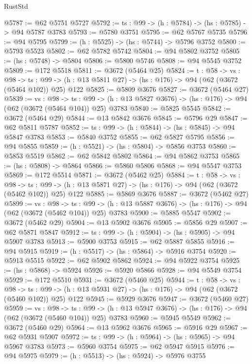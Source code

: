 \begin{lexlean}{RustStd}
\begin{coremodule}
@5787 := @62 @5751 @5727
@5792 := {ts : @99} -> (h : @5784) -> (hs : @5785) -> @94 @5787 @3783
@5793 := @5780 @3751
@5795 := @62 @5767 @5735
@5796 := @94 @5795
@5799 := (h : @5525) -> (hs : @5744) -> @5796 @3752
@5800 := @5793 @5523
@5802 := @62 @5782 @5742
@5804 := @94 @5802 @3752
@5805 := (hs : @5748) -> @5804
@5806 := @5800 @5746
@5808 := @94 @5545 @3752
@5809 := @172 @5518
@5811 := @3672 (@5464 @25)
@5824 := {t : @58} ->
  {vs : @98} ->
  {ts : @99} -> (h : @13 @5811 @27) -> (hs : @176) -> @94 (@62 (@3672 (@5464 @102)) @25) @122
@5825 := @5809 @3676
@5827 := @3672 (@5464 @27)
@5839 := {vs : @98} ->
  {ts : @99} -> (h : @13 @5827 @3676) -> (hs : @176) -> @94 (@62 (@3672 (@5464 @104)) @25) @3783
@5840 := @5825 @5545
@5842 := @3672 (@5464 @29)
@5844 := @13 @5842 @3676
@5845 := @5796 @29
@5847 := @62 @5811 @5787
@5852 := {ts : @99} -> (h : @5844) -> (hs : @5845) -> @94 @5847 @3783
@5853 := @5840 @3752
@5855 := @62 @5827 @5795
@5856 := @94 @5855
@5859 := (h : @5521) -> (hs : @5804) -> @5856 @3753
@5860 := @5853 @5519
@5862 := @62 @5842 @5802
@5864 := @94 @5862 @3753
@5865 := (hs : @5808) -> @5864
@5866 := @5860 @5806
@5868 := @94 @5547 @3753
@5869 := @172 @5514
@5871 := @3672 (@5462 @25)
@5884 := {t : @58} ->
  {vs : @98} ->
  {ts : @99} -> (h : @13 @5871 @27) -> (hs : @176) -> @94 (@62 (@3672 (@5462 @102)) @25) @122
@5885 := @5869 @3676
@5887 := @3672 (@5462 @27)
@5899 := {vs : @98} ->
  {ts : @99} -> (h : @13 @5887 @3676) -> (hs : @176) -> @94 (@62 (@3672 (@5462 @104)) @25) @3783
@5900 := @5885 @5547
@5902 := @3672 (@5462 @29)
@5904 := @13 @5902 @3676
@5905 := @5856 @29
@5907 := @62 @5871 @5847
@5912 := {ts : @99} -> (h : @5904) -> (hs : @5905) -> @94 @5907 @3783
@5913 := @5900 @3753
@5915 := @62 @5887 @5855
@5916 := @94 @5915
@5919 := (h : @5517) -> (hs : @5864) -> @5916 @3754
@5920 := @5913 @5515
@5922 := @62 @5902 @5862
@5924 := @94 @5922 @3754
@5925 := (hs : @5868) -> @5924
@5926 := @5920 @5866
@5928 := @94 @5549 @3754
@5929 := @172 @5510
@5931 := @3672 (@5460 @25)
@5944 := {t : @58} ->
  {vs : @98} ->
  {ts : @99} -> (h : @13 @5931 @27) -> (hs : @176) -> @94 (@62 (@3672 (@5460 @102)) @25) @122
@5945 := @5929 @3676
@5947 := @3672 (@5460 @27)
@5959 := {vs : @98} ->
  {ts : @99} -> (h : @13 @5947 @3676) -> (hs : @176) -> @94 (@62 (@3672 (@5460 @104)) @25) @3783
@5960 := @5945 @5549
@5962 := @3672 (@5460 @29)
@5964 := @13 @5962 @3676
@5965 := @5916 @29
@5967 := @62 @5931 @5907
@5972 := {ts : @99} -> (h : @5964) -> (hs : @5965) -> @94 @5967 @3783
@5973 := @5960 @3754
@5975 := @62 @5947 @5915
@5976 := @94 @5975
@5979 := (h : @5513) -> (hs : @5924) -> @5976 @3755

\end{coremodule}
\end{lexlean}
